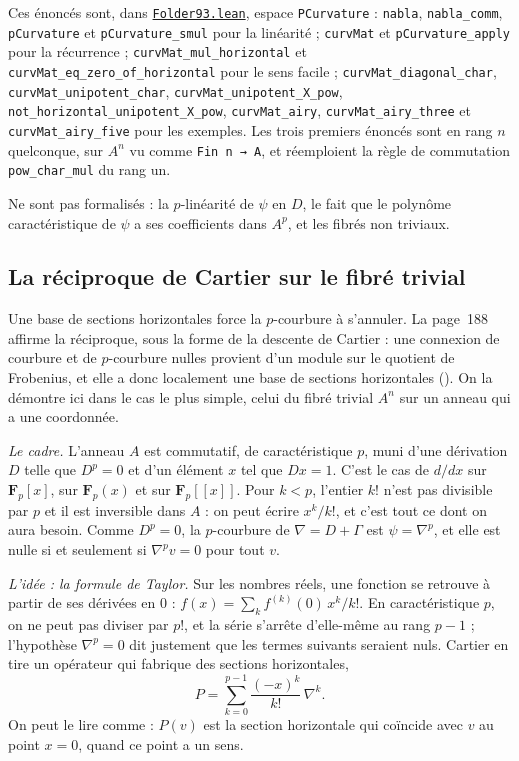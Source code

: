 {\sloppy\noindent Ces énoncés sont, dans \href{\leanblob/AlgebraicGeometry/Folder93.lean}{\texttt{Folder93.\allowbreak{}lean}}, espace \texttt{PCurvature} : \texttt{nabla}, \texttt{nabla\_comm}, \texttt{pCurvature} et \texttt{pCurvature\_smul} pour la linéarité ; \texttt{curvMat} et \texttt{pCurvature\_apply} pour la récurrence ; \texttt{curvMat\_mul\_horizontal} et \texttt{curvMat\_eq\_zero\_of\_horizontal} pour le sens facile ; \texttt{curvMat\_diagonal\_char}, \texttt{curvMat\_unipotent\_char}, \texttt{curvMat\_unipotent\_X\_pow}, \texttt{not\_horizontal\_unipotent\_X\_pow}, \texttt{curvMat\_airy}, \texttt{curvMat\_airy\_three} et \texttt{curvMat\_airy\_five} pour les exemples. Les trois premiers énoncés sont en rang $n$ quelconque, sur $A^n$ vu comme \texttt{Fin n → A}, et réemploient la règle de commutation \texttt{pow\_char\_mul} du rang un.\par}

Ne sont pas formalisés : la $p$-linéarité de $\psi$ en $D$, le fait que le polynôme caractéristique de $\psi$ a ses coefficients dans $A^p$, et les fibrés non triviaux.

\subsection*{La réciproque de Cartier sur le fibré trivial}

Une base de sections horizontales force la $p$-courbure à s'annuler. La page~188 affirme la réciproque, sous la forme de la descente de Cartier : une connexion de courbure et de $p$-courbure nulles provient d'un module sur le quotient de Frobenius, et elle a donc localement une base de sections horizontales (). On la démontre ici dans le cas le plus simple, celui du fibré trivial $A^n$ sur un anneau qui a une coordonnée.

\noindent\emph{Le cadre.} L'anneau $A$ est commutatif, de caractéristique $p$, muni d'une dérivation $D$ telle que $D^p = 0$ et d'un élément $x$ tel que $Dx = 1$. C'est le cas de $d/dx$ sur $\mathbf F_p[x]$, sur $\mathbf F_p(x)$ et sur $\mathbf F_p[[x]]$. Pour $k < p$, l'entier $k!$ n'est pas divisible par $p$ et il est inversible dans $A$ : on peut écrire $x^k/k!$, et c'est tout ce dont on aura besoin. Comme $D^p = 0$, la $p$-courbure de $\nabla = D + \Gamma$ est $\psi = \nabla^p$, et elle est nulle si et seulement si $\nabla^p v = 0$ pour tout $v$.

\noindent\emph{L'idée : la formule de Taylor.} Sur les nombres réels, une fonction se retrouve à partir de ses dérivées en $0$ : $f(x) = \sum_k f^{(k)}(0)\, x^k/k!$. En caractéristique $p$, on ne peut pas diviser par $p!$, et la série s'arrête d'elle-même au rang $p - 1$ ; l'hypothèse $\nabla^p = 0$ dit justement que les termes suivants seraient nuls. Cartier en tire un opérateur qui fabrique des sections horizontales,
\[
P = \sum_{k=0}^{p-1} \frac{(-x)^k}{k!}\, \nabla^k .
\]
On peut le lire comme  : $P(v)$ est la section horizontale qui coïncide avec $v$ au point $x = 0$, quand ce point a un sens.

